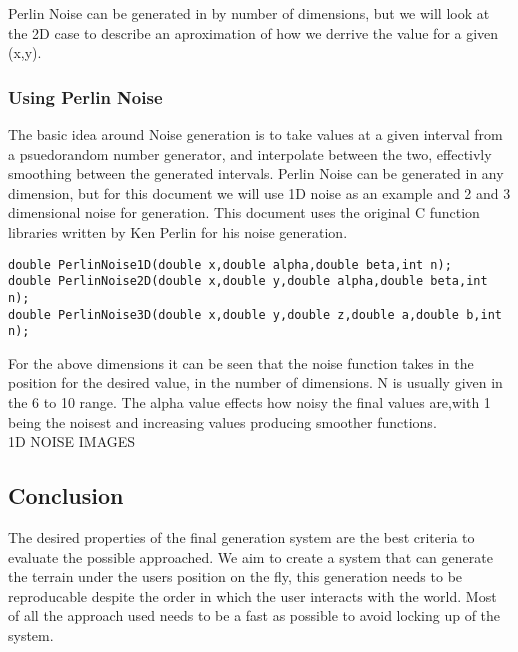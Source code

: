 Perlin Noise can be generated in by number of dimensions, but we will look at the
2D case to describe an aproximation of how we derrive the value for a given 
(x,y).\\


\subsubsection*{Using Perlin Noise}
The basic idea around Noise generation is to take values at a given interval from
a psuedorandom number generator, and interpolate between the two, effectivly 
smoothing between the generated intervals. Perlin Noise can be generated in any
dimension, but for this document we will use 1D noise as an example and 2 and 
3 dimensional noise for generation. This document uses the original C function
libraries written by Ken Perlin for his noise generation.\\ 

\begin{lstlisting}
double PerlinNoise1D(double x,double alpha,double beta,int n);
double PerlinNoise2D(double x,double y,double alpha,double beta,int n);
double PerlinNoise3D(double x,double y,double z,double a,double b,int n);
\end{lstlisting}

For the above dimensions it can be seen that the noise function takes in the 
position for the desired value, in the number of dimensions. N is usually given
in the 6 to 10 range. The alpha value effects how noisy the final values are,with
1 being the noisest and increasing values producing smoother functions.\\

1D NOISE IMAGES\\


\subsection{Conclusion}
The desired properties of the final generation system are the best criteria to
evaluate the possible approached. We aim to create a system that can generate
the terrain under the users position on the fly, this generation needs to be
reproducable despite the order in which the user interacts with the world. Most
of all the approach used needs to be a fast as possible to avoid locking up of
the system.\\

